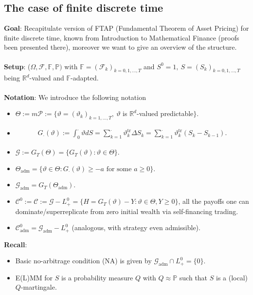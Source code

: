 \documentclass[12pt,a4paper, twoside]{article}
\theoremstyle{definition}
\newcommand{\PP}{\mathbb{P}} %
\begin{document}
\subsection{The case of finite discrete time}
\textbf{Goal}: Recapitulate version of FTAP (Fundamental Theorem of Asset Pricing) for finite discrete time, known from Introduction to Mathematical Finance (proofs been presented there), moreover we want to give an overview of the structure. 
\\\\
\textbf{Setup}: ($\Omega, \mathcal{F}, \mathbb{F}, \PP)$ with $\mathbb{F}= ( \mathcal{F}_k)_{k=0,1 , \dots , T}$ and $S^0=1, \ S=(S_k)_{k=0,1, \dots , T}$ being $\mathbb{R}^d$-valued and $\mathbb{F}$-adapted. 
\\\\
\textbf{Notation}: We introduce the following notation
\begin{itemize}
\item $\Theta := m \mathcal{P}:= \{ \vartheta = (\vartheta_k)_{k=1, \dots ,T}, \ \vartheta$ is $\mathbb{R}^d$-valued predictable$\}$.
\item 
\begin{align*}
G_\cdot (\vartheta):= \int_0^\cdot \vartheta dS = \sum_{k=1}^\cdot \vartheta_k^\text{tr} \Delta S_k = \sum_{k=1}^\cdot \vartheta_k^\text{tr} (S_k-S_{k-1}). 
\end{align*}
\item $\mathcal{G}:= G_T( \Theta)= \{ G_T( \vartheta): \vartheta \in \Theta\}$. 
\item $\Theta_\text{adm} = \{ \vartheta \in \Theta : G_\cdot ( \vartheta) \geq -a \text{ for some } a \geq 0 \}$. 
\item $\mathcal{G}_\text{adm}= G_T( \Theta_\text{adm})$.  
\item $\mathcal{C}^0:= \mathcal{C}:= \mathcal{G}- L_+^0 = \{ H = G_T( \vartheta) - Y: \vartheta \in \Theta, Y \geq 0 \}$, all the payoffs one can dominate/superreplicate from zero initial wealth via self-financing trading. 
\item $\mathcal{C}_\text{adm}^0= \mathcal{G}_\text{adm}-L_+^0$ (analogous, with strategy even admissible). 
\end{itemize}
\textbf{Recall}: \begin{itemize}
\item Basic no-arbitrage condition (NA) is given by $\mathcal{G}_\text{adm} \cap L_+^0 = \{0 \}$. 
\item E(L)MM for $S$ is a probability measure $Q$ with $Q \approx \PP$ such that $S$ is a (local) $Q$-martingale. 
\end{itemize}
\end{document}
